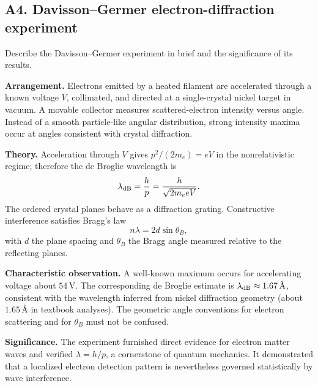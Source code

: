 \documentclass[11pt,a4paper]{article}
\begin{document}
\subsection{A4. Davisson--Germer electron-diffraction experiment}
\begin{questionbox}Describe the Davisson--Germer experiment in brief and the significance of its results.\end{questionbox}
\textbf{Arrangement.} Electrons emitted by a heated filament are accelerated through a known voltage $V$, collimated, and directed at a single-crystal nickel target in vacuum. A movable collector measures scattered-electron intensity versus angle. Instead of a smooth particle-like angular distribution, strong intensity maxima occur at angles consistent with crystal diffraction.
\par\textbf{Theory.} Acceleration through $V$ gives $p^2/(2m_e)=eV$ in the nonrelativistic regime; therefore the de Broglie wavelength is
\begin{equation}\label{eq:dgb}
\lambda_{\rm dB}=\frac{h}{p}=\frac{h}{\sqrt{2m_eeV}}.
\end{equation}
The ordered crystal planes behave as a diffraction grating. Constructive interference satisfies Bragg's law
\begin{equation}\label{eq:bragg}
\boxed{n\lambda=2d\sin\theta_B},
\end{equation}
with $d$ the plane spacing and $\theta_B$ the Bragg angle measured relative to the reflecting planes.
\par\textbf{Characteristic observation.} A well-known maximum occurs for accelerating voltage about $54\,\mathrm{V}$. The corresponding de Broglie estimate is $\lambda_{\rm dB}\approx1.67\,\text{\AA}$, consistent with the wavelength inferred from nickel diffraction geometry (about $1.65\,\text{\AA}$ in textbook analyses). The geometric angle conventions for electron scattering and for $\theta_B$ must not be confused.
\par\textbf{Significance.} The experiment furnished direct evidence for electron matter waves and verified $\lambda=h/p$, a cornerstone of quantum mechanics. It demonstrated that a localized electron detection pattern is nevertheless governed statistically by wave interference.
\end{document}
